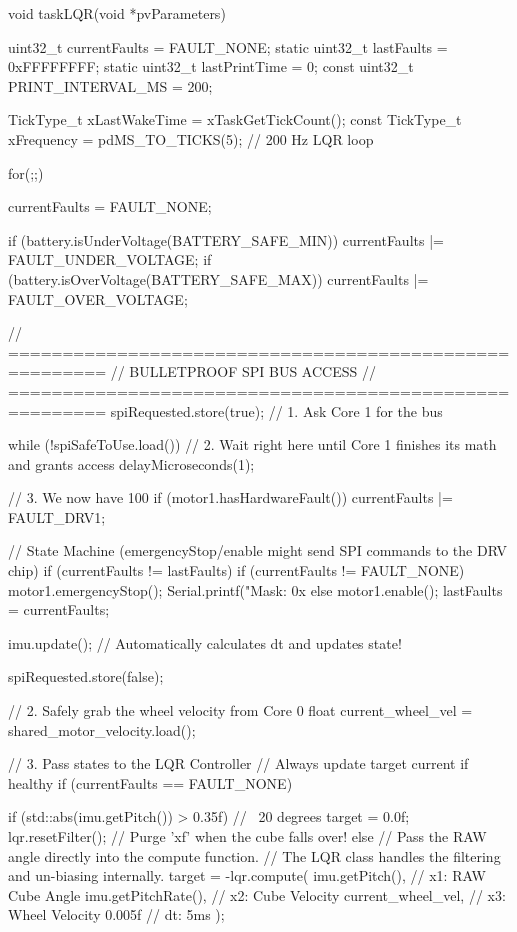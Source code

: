 void taskLQR(void *pvParameters) {
    uint32_t currentFaults = FAULT_NONE;
    static uint32_t lastFaults = 0xFFFFFFFF; 
    static uint32_t lastPrintTime = 0;
    const uint32_t PRINT_INTERVAL_MS = 200; 

    TickType_t xLastWakeTime = xTaskGetTickCount();
    const TickType_t xFrequency = pdMS_TO_TICKS(5); // 200 Hz LQR loop

    for(;;) {
        currentFaults = FAULT_NONE; 

        if (battery.isUnderVoltage(BATTERY_SAFE_MIN)) currentFaults |= FAULT_UNDER_VOLTAGE;
        if (battery.isOverVoltage(BATTERY_SAFE_MAX))  currentFaults |= FAULT_OVER_VOLTAGE;

        // =======================================================
        // BULLETPROOF SPI BUS ACCESS
        // =======================================================
        spiRequested.store(true); // 1. Ask Core 1 for the bus
        
        while (!spiSafeToUse.load()) { 
            // 2. Wait right here until Core 1 finishes its math and grants access
            delayMicroseconds(1); 
        }

        // 3. We now have 100%
        if (motor1.hasHardwareFault()) currentFaults |= FAULT_DRV1;
        
        // State Machine (emergencyStop/enable might send SPI commands to the DRV chip)
        if (currentFaults != lastFaults) {
            if (currentFaults != FAULT_NONE) {
                motor1.emergencyStop();
                Serial.printf(" Mask: 0x%
            } else {
                motor1.enable();
            }
            lastFaults = currentFaults;
        }

        imu.update(); // Automatically calculates dt and updates state!

        spiRequested.store(false);
        
        // 2. Safely grab the wheel velocity from Core 0
        float current_wheel_vel = shared_motor_velocity.load();
        
        // 3. Pass states to the LQR Controller
        // Always update target current if healthy
        if (currentFaults == FAULT_NONE) {
            
            if (std::abs(imu.getPitch()) > 0.35f) { // ~20 degrees
                target = 0.0f; 
                lqr.resetFilter(); // Purge 'xf' when the cube falls over!
            } else {
                // Pass the RAW angle directly into the compute function.
                // The LQR class handles the filtering and un-biasing internally.
                target = -lqr.compute(
                    imu.getPitch(),         // x1: RAW Cube Angle
                    imu.getPitchRate(),     // x2: Cube Velocity
                    current_wheel_vel,      // x3: Wheel Velocity
                    0.005f                  // dt: 5ms
                );
            }
        }

}}
